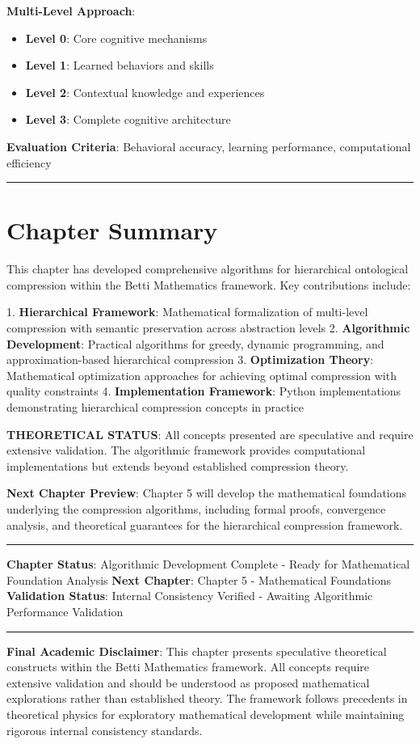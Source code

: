 \textbf{Multi-Level Approach}:
\begin{itemize}
\item \textbf{Level 0}: Core cognitive mechanisms
\item \textbf{Level 1}: Learned behaviors and skills
\item \textbf{Level 2}: Contextual knowledge and experiences
\item \textbf{Level 3}: Complete cognitive architecture
\end{itemize}

\textbf{Evaluation Criteria}: Behavioral accuracy, learning performance, computational efficiency

\hrule

\section{Chapter Summary}

This chapter has developed comprehensive algorithms for hierarchical ontological compression within the Betti Mathematics framework. Key contributions include:

1. \textbf{Hierarchical Framework}: Mathematical formalization of multi-level compression with semantic preservation across abstraction levels
2. \textbf{Algorithmic Development}: Practical algorithms for greedy, dynamic programming, and approximation-based hierarchical compression
3. \textbf{Optimization Theory}: Mathematical optimization approaches for achieving optimal compression with quality constraints
4. \textbf{Implementation Framework}: Python implementations demonstrating hierarchical compression concepts in practice

\textbf{THEORETICAL STATUS}: All concepts presented are speculative and require extensive validation. The algorithmic framework provides computational implementations but extends beyond established compression theory.

\textbf{Next Chapter Preview}: Chapter 5 will develop the mathematical foundations underlying the compression algorithms, including formal proofs, convergence analysis, and theoretical guarantees for the hierarchical compression framework.

\hrule

\textbf{Chapter Status}: Algorithmic Development Complete - Ready for Mathematical Foundation Analysis  
\textbf{Next Chapter}: Chapter 5 - Mathematical Foundations  
\textbf{Validation Status}: Internal Consistency Verified - Awaiting Algorithmic Performance Validation

\hrule

\textbf{Final Academic Disclaimer}: This chapter presents speculative theoretical constructs within the Betti Mathematics framework. All concepts require extensive validation and should be understood as proposed mathematical explorations rather than established theory. The framework follows precedents in theoretical physics for exploratory mathematical development while maintaining rigorous internal consistency standards.